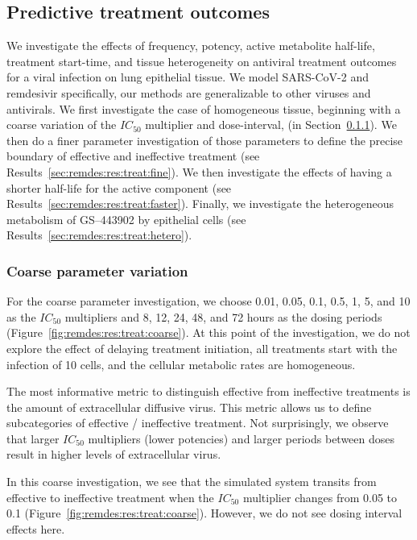 \subsection{Predictive treatment outcomes}\label{sec:remdes:res:treat}

We investigate the effects of frequency, potency, active metabolite half-life, treatment start-time, and tissue heterogeneity on antiviral treatment outcomes for a viral infection on lung epithelial tissue. We model SARS-CoV-2 and remdesivir specifically, our methods are generalizable to other viruses and antivirals. We first investigate the case of homogeneous tissue, beginning with a coarse variation of the $IC_{50}$ multiplier and dose-interval, (in Section~\ref{sec:remdes:res:treat:coarse}). We then do a finer parameter investigation of those parameters to define the precise boundary of effective and ineffective treatment (see Results~\ref{sec:remdes:res:treat:fine}). We then investigate the effects of having a shorter half-life for the active component (see Results~\ref{sec:remdes:res:treat:faster}). Finally, we investigate the heterogeneous metabolism of GS--443902 by epithelial cells (see Results~\ref{sec:remdes:res:treat:hetero}).

\subsubsection{Coarse parameter variation}\label{sec:remdes:res:treat:coarse}

For the coarse parameter investigation, we choose 0.01, 0.05, 0.1, 0.5, 1, 5, and 10 as the $IC_{50}$ multipliers and 8, 12, 24, 48, and 72 hours as the dosing periods (Figure~\ref{fig:remdes:res:treat:coarse}). At this point of the investigation, we do not explore the effect of delaying treatment initiation, all treatments start with the infection of 10 cells, and the cellular metabolic rates are homogeneous. 

The most informative metric to distinguish effective from ineffective treatments is the amount of extracellular diffusive virus. This metric allows us to define subcategories of effective / ineffective treatment. Not surprisingly, we observe that larger $IC_{50}$ multipliers (lower potencies) and larger periods between doses result in higher levels of extracellular virus. 

In this coarse investigation, we see that the simulated system transits from effective to ineffective treatment when the $IC_{50}$ multiplier changes from 0.05 to 0.1 (Figure~\ref{fig:remdes:res:treat:coarse}). However, we do not see dosing interval effects here. 


